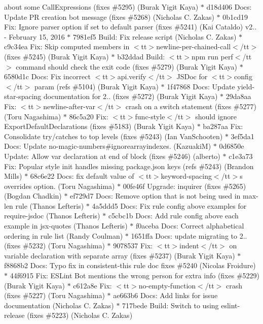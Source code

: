\begin{DoxyItemize}
about some Call\+Expressions (fixes \#5295) (\+Burak Yigit Kaya) \texorpdfstring{$\ast$}{*} d18d406 Docs\+: Update PR creation bot message (fixes \#5268) (\+Nicholas C. Zakas) \texorpdfstring{$\ast$}{*} 0b1cd19 Fix\+: Ignore parser option if set to default parser (fixes \#5241) (\+Kai Cataldo)  v2.. -\/ February 15, 2016  \texorpdfstring{$\ast$}{*} 7981ef5 Build\+: Fix release script (\+Nicholas C. Zakas) \texorpdfstring{$\ast$}{*} c9c34ea Fix\+: Skip computed members in $<$tt$>$newline-\/per-\/chained-\/call$<$/tt$>$ (fixes \#5245) (\+Burak Yigit Kaya) \texorpdfstring{$\ast$}{*} b32ddad Build\+: $<$tt$>$npm run perf$<$/tt$>$ command should check the exit code (fixes \#5279) (\+Burak Yigit Kaya) \texorpdfstring{$\ast$}{*} 6580d1c Docs\+: Fix incorrect $<$tt$>$api.\+verify$<$/tt$>$ JSDoc for $<$tt$>$config$<$/tt$>$ param (refs \#5104) (\+Burak Yigit Kaya) \texorpdfstring{$\ast$}{*} 1f47868 Docs\+: Update yield-\/star-\/spacing documentation for 2.. (fixes \#5272) (\+Burak Yigit Kaya) \texorpdfstring{$\ast$}{*} 29da8aa Fix\+: $<$tt$>$newline-\/after-\/var$<$/tt$>$ crash on a switch statement (fixes \#5277) (\+Toru Nagashima) \texorpdfstring{$\ast$}{*} 86c5a20 Fix\+: $<$tt$>$func-\/style$<$/tt$>$ should ignore Export\+Default\+Declarations (fixes \#5183) (\+Burak Yigit Kaya) \texorpdfstring{$\ast$}{*} ba287aa Fix\+: Consolidate try/catches to top levels (fixes \#5243) (\+Ian Van\+Schooten) \texorpdfstring{$\ast$}{*} 3ef5da1 Docs\+: Update no-\/magic-\/numbers\#ignorearrayindexes. (\+Kazuaki\+M) \texorpdfstring{$\ast$}{*} 0d6850e Update\+: Allow var declaration at end of block (fixes \#5246) (alberto) \texorpdfstring{$\ast$}{*} c1e3a73 Fix\+: Popular style init handles missing package.\+json keys (refs \#5243) (\+Brandon Mills) \texorpdfstring{$\ast$}{*} 68c6e22 Docs\+: fix default value of $<$tt$>$keyword-\/spacing$<$/tt$>$\textquotesingle{}s overrides option. (\+Toru Nagashima) \texorpdfstring{$\ast$}{*} 00fe46f Upgrade\+: inquirer (fixes \#5265) (\+Bogdan Chadkin) \texorpdfstring{$\ast$}{*} ef729d7 Docs\+: Remove option that is not being used in max-\/len rule (\+Thanos Lefteris) \texorpdfstring{$\ast$}{*} 4a5ddd5 Docs\+: Fix rule config above examples for require-\/jsdoc (\+Thanos Lefteris) \texorpdfstring{$\ast$}{*} c5cbc1b Docs\+: Add rule config above each example in jsx-\/quotes (\+Thanos Lefteris) \texorpdfstring{$\ast$}{*} f0aceba Docs\+: Correct alphabetical ordering in rule list (\+Randy Coulman) \texorpdfstring{$\ast$}{*} 1651ffa Docs\+: update migrating to 2.. (fixes \#5232) (\+Toru Nagashima) \texorpdfstring{$\ast$}{*} 9078537 Fix\+: $<$tt$>$indent$<$/tt$>$ on variable declaration with separate array (fixes \#5237) (\+Burak Yigit Kaya) \texorpdfstring{$\ast$}{*} f8868b2 Docs\+: Typo fix in consistent-\/this rule doc fixes \#5240 (\+Nicolas Froidure) \texorpdfstring{$\ast$}{*} 44f6915 Fix\+: ESLint Bot mentions the wrong person for extra info (fixes \#5229) (\+Burak Yigit Kaya) \texorpdfstring{$\ast$}{*} c612a8e Fix\+: $<$tt$>$no-\/empty-\/function$<$/tt$>$ crash (fixes \#5227) (\+Toru Nagashima) \texorpdfstring{$\ast$}{*} ae663b6 Docs\+: Add links for issue documentation (\+Nicholas C. Zakas) \texorpdfstring{$\ast$}{*} 717bede Build\+: Switch to using eslint-\/release (fixes \#5223) (\+Nicholas C. Zakas) 
\end{DoxyItemize}
